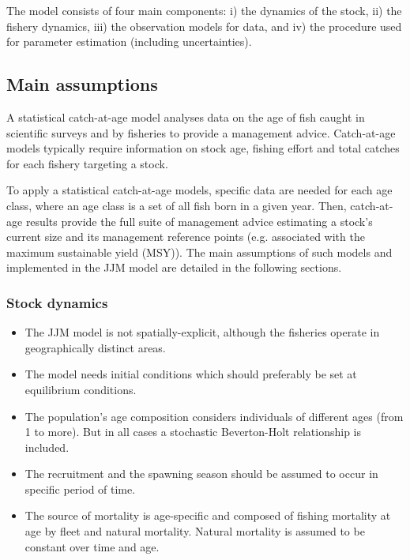 \documentclass{article}
\begin{document}
The model consists of four main components: i) the dynamics of the stock, ii) the fishery dynamics, iii) the observation models for data, and iv) the procedure used for parameter estimation (including uncertainties).

\subsection{Main assumptions}

A statistical catch-at-age model analyses data on the age of fish caught in scientific surveys and by fisheries to provide a management advice. Catch-at-age models typically require information on stock age, fishing effort and total catches for each fishery targeting a stock.

To apply a statistical catch-at-age models, specific data are needed for each age class, where an age class is a set of all fish born in a given year. Then, catch-at-age results provide the full suite of management advice estimating a stock's current size and its management reference points (e.g. associated with the maximum sustainable yield (MSY)). The main assumptions of such models and implemented in the JJM model are detailed in the following sections.

\subsubsection{Stock dynamics}

\begin{itemize}

\item The JJM model is not spatially-explicit, although the fisheries operate in geographically distinct areas.

\item The model needs initial conditions which should preferably be set at equilibrium conditions.

\item The population's age composition considers individuals of different ages (from 1 to more). But in all cases a stochastic Beverton-Holt relationship is included.

\item The recruitment and the spawning season should be assumed to occur in specific period of time.


\item The source of mortality is age-specific and composed of fishing mortality at age by fleet and natural mortality. Natural mortality is assumed to be constant over time and age.

\end{itemize}
\end{document}
